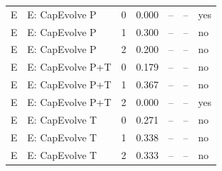\begin{table}[t]
\begin{tabular}{@{}llrrrrl@{}}
E & E: CapEvolve P & 0 & 0.000 & -- & -- & yes \\
E & E: CapEvolve P & 1 & 0.300 & -- & -- & no \\
E & E: CapEvolve P & 2 & 0.200 & -- & -- & no \\
E & E: CapEvolve P+T & 0 & 0.179 & -- & -- & no \\
E & E: CapEvolve P+T & 1 & 0.367 & -- & -- & no \\
E & E: CapEvolve P+T & 2 & 0.000 & -- & -- & yes \\
E & E: CapEvolve T & 0 & 0.271 & -- & -- & no \\
E & E: CapEvolve T & 1 & 0.338 & -- & -- & no \\
E & E: CapEvolve T & 2 & 0.333 & -- & -- & no \\
\bottomrule
\end{tabular}
\end{table}
